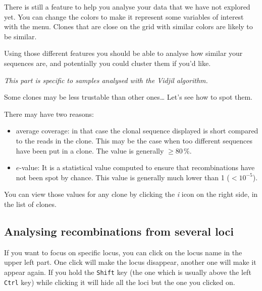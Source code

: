 \documentclass[11pt]{article}
\begin{document}

There is still a feature to help you analyse your data that we have not
explored yet.
You can change the colors to make it represent some variables of interest
with the  menu.
Clones that are close on the grid with similar colors are likely to
be similar.

Using those different features you should be able to analyse how similar your
sequences are, and potentially you could cluster them if you'd like.


\bigskip

\textit{This part is specific to samples analysed with the Vidjil algorithm.}

Some clones may be less trustable than other ones\dots{} Let's see how to spot them.

There may have two reasons: 
\begin{itemize}
\item average coverage: in that case the clonal sequence displayed is short
  compared to the reads in the clone. This may be the case when too different
  sequences have been put in a clone. The value is generally $\geq 80\,\%$.
\item $e$-value: It is a statistical value computed to ensure that
  recombinations have not been spot by chance. This value is generally much
  lower than 1 ($<10^{-5}$).
\end{itemize}

You can view those values for any clone by clicking the \textit{i} icon on the
right side, in the list of clones.
\subsection{Analysing recombinations from several loci}

If you want to focus on specific locus, you can click on the locus name in
the upper left part. One click will make the locus disappear, another one will
make it appear again.
If you hold the \texttt{Shift} key (the one which is usually above the left
\texttt{Ctrl} key) while clicking it will hide all the loci but the one you
clicked on.
\end{document}
